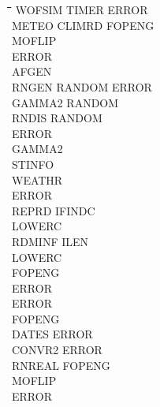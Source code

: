 \begin{tabbing}
\hspace{1.27cm}\=\hspace{1.27cm}\=\hspace{1.27cm}\=\hspace{1.27cm}\=%
\hspace{1.27cm}\=\hspace{1.27cm}\=\hspace{1.27cm}\=\hspace{1.27cm}\=%
\hspace{1.27cm}\=\hspace{1.27cm}\=\kill
\>\> \> \> WOFSIM\> \> TIMER\> \> ERROR\\
\>\> \> \> \> \> METEO\> \> CLIMRD\> FOPENG\\
\>\> \> \> \> \> \> \> \> MOFLIP\\
\>\> \> \> \> \> \> \> \> ERROR\\
\>\> \> \> \> \> \> \> \> AFGEN\\
\>\> \> \> \> \> \> \> \> RNGEN \> RANDOM ERROR\\
\>\> \> \> \> \> \> \> \> \> GAMMA2 RANDOM\\
\>\> \> \> \> \> \> \> \> RNDIS\> RANDOM\\
\>\> \> \> \> \> \> \> \> \> ERROR\\
\>\> \> \> \> \> \> \> \> \> GAMMA2\\
\>\> \> \> \> \> \> \> STINFO\\
\>\> \> \> \> \> \> \> WEATHR\\
\>\> \> \> \> \> \> \> ERROR\\
\>\> \> \> \> \> \> \> REPRD\> IFINDC\\
\>\> \> \> \> \> \> \> \> LOWERC\\
\>\> \> \> \> \> \> \> \> RDMINF\> ILEN\\
\>\> \> \> \> \> \> \> \> \> LOWERC\\
\>\> \> \> \> \> \> \> \> \> FOPENG\\
\>\> \> \> \> \> \> \> \> \> ERROR\\
\>\> \> \> \> \> \> \> \> ERROR\\
\>\> \> \> \> \> \> \> \> FOPENG\\
\>\> \> \> \> \> \> \> \> DATES\> ERROR\\
\>\> \> \> \> \> \> \> \> CONVR2\> ERROR\\
\>\> \> \> \> \> \> \> RNREAL\> FOPENG\\
\>\> \> \> \> \> \> \> \> MOFLIP\\
\>\> \> \> \> \> \> \> \> ERROR\\

\end{tabbing}
